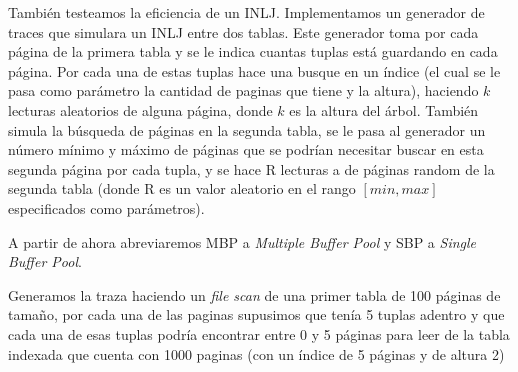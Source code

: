 También testeamos la eficiencia de un INLJ. Implementamos un generador de traces que simulara un INLJ entre dos tablas.
Este generador toma por cada página de la primera tabla y se le indica cuantas tuplas está guardando en cada página. 
Por cada una de estas tuplas hace una busque en un índice (el cual se le pasa como  parámetro la cantidad de paginas
que tiene y la altura), haciendo $k$ lecturas aleatorios de alguna página, donde $k$ es la altura del árbol. También simula
la búsqueda de páginas en la segunda tabla, se le pasa al generador un número mínimo y máximo de páginas que se 
podrían necesitar buscar en esta segunda página por cada tupla, y se hace R lecturas a de páginas random de la
segunda tabla (donde R es un valor aleatorio en el rango $[min,max]$ especificados como parámetros).

A partir de ahora abreviaremos MBP a \textit{Multiple Buffer Pool} y SBP a \textit{Single Buffer Pool}.

Generamos la traza haciendo un \textit{file scan} de una primer tabla de 100 páginas de tama\~{n}o, por cada una de las paginas
supusimos que tenía 5 tuplas adentro y que cada una de esas tuplas podría encontrar entre 0 y 5 páginas
para leer de la tabla indexada que cuenta con 1000 paginas (con un índice de 5 páginas y de altura 2)

